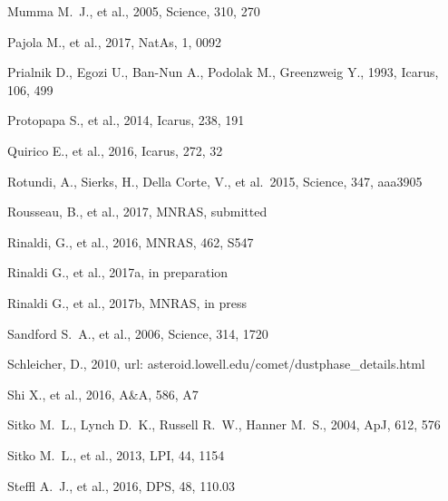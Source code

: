 \documentclass[a4paper,fleqn,usenatbib]{mnras}
\begin{document}
\begin{thebibliography}{99}
 Mumma M.~J., et al., 2005, Science, 310, 270

 Pajola M., et al., 2017, NatAs, 1, 0092

 Prialnik D., Egozi U., Ban-Nun A., Podolak M., Greenzweig Y., 1993, Icarus, 106, 499


 Protopapa S., et al., 2014, Icarus, 238, 191

 Quirico E., et al., 2016, Icarus, 272, 32

 Rotundi, A., Sierks, H., Della Corte, V., et al.\ 2015, Science, 347, aaa3905

 Rousseau, B., et al., 2017, MNRAS, submitted

 Rinaldi, G.,  et al., 2016, MNRAS, 462, S547


 Rinaldi G., et al., 2017a, in preparation

 Rinaldi G., et al., 2017b, MNRAS, in press

 Sandford S.~A., et al., 2006, Science, 314, 1720



Schleicher, D., 2010, url: asteroid.lowell.edu/comet/dustphase\_details.html

 Shi X., et al., 2016, A\&A, 586, A7

 Sitko M.~L., Lynch D.~K., Russell R.~W., Hanner M.~S., 2004, ApJ, 612, 576

 Sitko M.~L., et al., 2013, LPI, 44, 1154


 Steffl A.~J., et al., 2016, DPS, 48, 110.03


\end{thebibliography}
\end{document}
